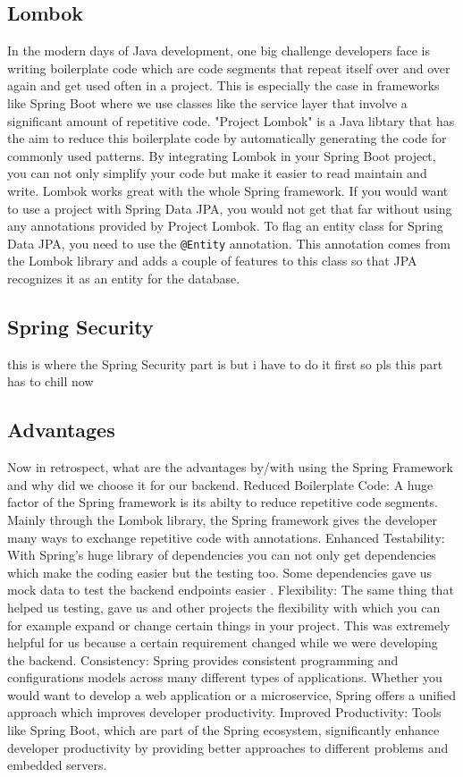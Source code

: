     \subsection{Lombok}  \newline
    In the modern days of Java development, one big challenge developers face is writing boilerplate code which are code segments that repeat itself over and over again and get used often in a project. This is especially the case in frameworks like Spring Boot where we use classes like the service layer that involve a significant amount of repetitive code.
    "Project Lombok" is a Java libtary that has the aim to reduce this boilerplate code by automatically generating the code for commonly used patterns. By integrating Lombok in your Spring Boot project, you can not only simplify your code but make it easier to read maintain and write. 
    Lombok works great with the whole Spring framework. If you would want to use a project with Spring Data JPA, you would not get that far without using any annotations provided by Project Lombok. To flag an entity class for Spring Data JPA, you need to use the \texttt{@Entity} annotation. This annotation comes from the Lombok library and adds a couple of 
    features to this class so that JPA recognizes it as an entity for the database.

    \subsection{Spring Security}
    this is where the Spring Security part is but i have to do it first so pls this part has to chill now
    
    \subsection{Advantages}
    Now in retrospect, what are the advantages by/with using the Spring Framework and why did we choose it for our backend.
    Reduced Boilerplate Code: A huge factor of the Spring framework is its abilty to reduce repetitive code segments. Mainly through the Lombok library, the Spring framework gives the developer many ways to exchange repetitive code with annotations.
    Enhanced Testability: With Spring's huge library of dependencies you can not only get dependencies which make the coding easier but the testing too. Some dependencies gave us mock data to test the backend endpoints easier .
    Flexibility: The same thing that helped us testing, gave us and other projects the flexibility with which you can for example expand or change certain things in your project. This was extremely helpful for us because a certain requirement changed while we were developing the backend.
    Consistency: Spring provides consistent programming and configurations models across many different types of applications. Whether you would want to develop a web application or a microservice, Spring offers a unified approach which improves developer productivity.
    Improved Productivity: Tools like Spring Boot, which are part of the Spring ecosystem, significantly enhance developer productivity by providing better approaches to different problems and embedded servers. 
    